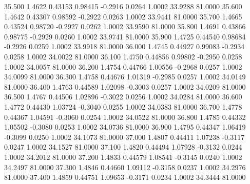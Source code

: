   35.500   1.4622   0.43153   0.98415  -0.2916   0.0264   1.0002  33.9288  81.0000
  35.600   1.4642   0.43307   0.98592  -0.2922   0.0263   1.0002  33.9441  81.0000
  35.700   1.4665   0.43524   0.98720  -0.2927   0.0262   1.0002  33.9590  81.0000
  35.800   1.4691   0.43866   0.98775  -0.2929   0.0260   1.0002  33.9741  81.0000
  35.900   1.4725   0.44540   0.98684  -0.2926   0.0259   1.0002  33.9918  81.0000
  36.000   1.4745   0.44927   0.99083  -0.2934   0.0258   1.0002  34.0022  81.0000
  36.100   1.4750   0.44856   0.99802  -0.2950   0.0258   1.0002  34.0057  81.0000
  36.200   1.4754   0.44766   1.00556  -0.2968   0.0257   1.0002  34.0099  81.0000
  36.300   1.4758   0.44676   1.01319  -0.2985   0.0257   1.0002  34.0149  81.0000
  36.400   1.4763   0.44589   1.02098  -0.3003   0.0257   1.0002  34.0209  81.0000
  36.500   1.4767   0.44506   1.02896  -0.3022   0.0256   1.0002  34.0284  81.0000
  36.600   1.4772   0.44430   1.03724  -0.3040   0.0255   1.0002  34.0383  81.0000
  36.700   1.4778   0.44367   1.04591  -0.3060   0.0254   1.0002  34.0522  81.0000
  36.800   1.4785   0.44332   1.05502  -0.3080   0.0253   1.0002  34.0736  81.0000
  36.900   1.4795   0.44347   1.06419  -0.3099   0.0250   1.0002  34.1073  81.0000
  37.000   1.4807   0.44411   1.07238  -0.3117   0.0247   1.0002  34.1527  81.0000
  37.100   1.4820   0.44494   1.07928  -0.3132   0.0244   1.0002  34.2012  81.0000
  37.200   1.4833   0.44579   1.08541  -0.3145   0.0240   1.0002  34.2497  81.0000
  37.300   1.4846   0.44660   1.09112  -0.3158   0.0237   1.0002  34.2976  81.0000
  37.400   1.4859   0.44751   1.09653  -0.3171   0.0234   1.0002  34.3444  81.0000
